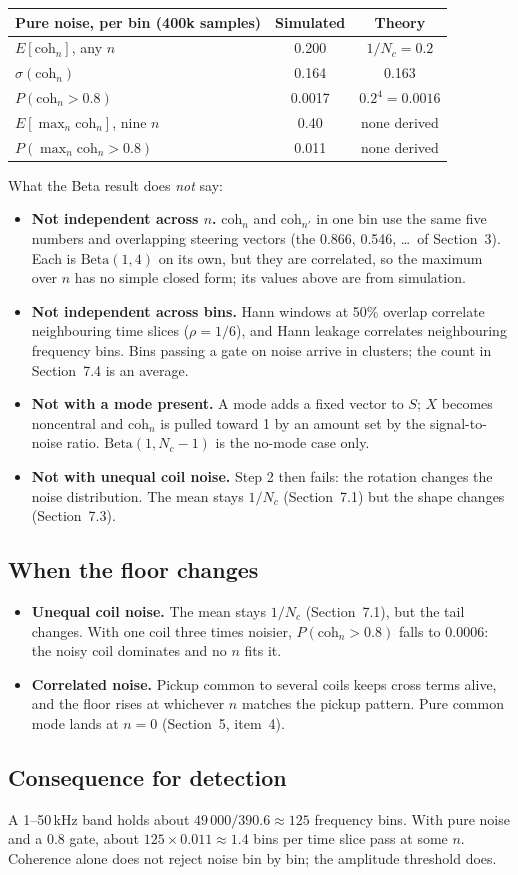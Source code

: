 \documentclass[11pt]{article}
\begin{document}
\begin{center}
\begin{tabular}{lcc}
\toprule
Pure noise, per bin (400k samples) & Simulated & Theory \\
\midrule
$E[\mathrm{coh}_n]$, any $n$ & 0.200 & $1/N_c = 0.2$ \\
$\sigma(\mathrm{coh}_n)$ & 0.164 & 0.163 \\
$P(\mathrm{coh}_n > 0.8)$ & 0.0017 & $0.2^4 = 0.0016$ \\
$E[\max_n \mathrm{coh}_n]$, nine $n$ & 0.40 & none derived \\
$P(\max_n \mathrm{coh}_n > 0.8)$ & 0.011 & none derived \\
\bottomrule
\end{tabular}
\end{center}
What the Beta result does \emph{not} say:
\begin{itemize}
\item \textbf{Not independent across $n$.} $\mathrm{coh}_n$ and
  $\mathrm{coh}_{n'}$ in one bin use the same five numbers and overlapping
  steering vectors (the 0.866, 0.546, \ldots\ of Section~3). Each is
  $\mathrm{Beta}(1,4)$ on its own, but they are correlated, so the maximum
  over $n$ has no simple closed form; its values above are from simulation.
\item \textbf{Not independent across bins.} Hann windows at 50\% overlap
  correlate neighbouring time slices ($\rho=1/6$), and Hann leakage
  correlates neighbouring frequency bins. Bins passing a gate on noise
  arrive in clusters; the count in Section~7.4 is an average.
\item \textbf{Not with a mode present.} A mode adds a fixed vector to $S$;
  $X$ becomes noncentral and $\mathrm{coh}_n$ is pulled toward 1 by an
  amount set by the signal-to-noise ratio. $\mathrm{Beta}(1,N_c-1)$ is the
  no-mode case only.
\item \textbf{Not with unequal coil noise.} Step 2 then fails: the rotation
  changes the noise distribution. The mean stays $1/N_c$ (Section~7.1) but
  the shape changes (Section~7.3).
\end{itemize}

\subsection{When the floor changes}
\begin{itemize}
\item \textbf{Unequal coil noise.} The mean stays $1/N_c$ (Section~7.1), but
  the tail changes. With one coil three times noisier,
  $P(\mathrm{coh}_n>0.8)$ falls to $0.0006$: the noisy coil dominates and
  no $n$ fits it.
\item \textbf{Correlated noise.} Pickup common to several coils keeps cross
  terms alive, and the floor rises at whichever $n$ matches the pickup
  pattern. Pure common mode lands at $n=0$ (Section~5, item~4).
\end{itemize}

\subsection{Consequence for detection}
A 1--50\,kHz band holds about $49\,000/390.6\approx125$ frequency bins. With
pure noise and a 0.8 gate, about $125\times0.011\approx1.4$ bins per time
slice pass at some $n$. Coherence alone does not reject noise bin by bin;
the amplitude threshold does.
\end{document}
